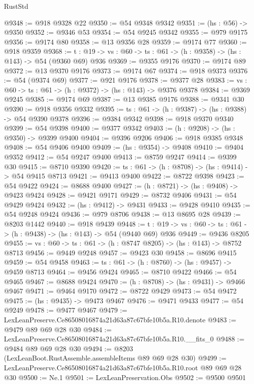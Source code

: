 \begin{lexlean}{RustStd}
\begin{coremodule}
@9348 := @918 @9328 @22
@9350 := @54 @9348 @9342
@9351 := (hs : @56) -> @9350
@9352 := @9346 @53
@9354 := @54 @9245 @9342
@9355 := @979 @9175
@9356 := @9174 @80
@9358 := @13 @9356 @28
@9359 := @9174 @77
@9360 := @918 @9359
@9368 := {t : @19} -> {vs : @60} -> {ts : @61} -> (h : @9358) -> (hs : @143) -> @54 (@9360 @69) @936
@9369 := @9355 @9176
@9370 := @9174 @89
@9372 := @13 @9370 @9176
@9373 := @9174 @67
@9374 := @918 @9373
@9376 := @54 (@9374 @69)
@9377 := @921 @9176
@9378 := @9377 @28
@9383 := {vs : @60} -> {ts : @61} -> (h : @9372) -> (hs : @143) -> @9376 @9378
@9384 := @9369 @9245
@9385 := @9174 @69
@9387 := @13 @9385 @9176
@9388 := @9341 @30
@9390 := @918 @9356 @9332
@9395 := {ts : @61} -> (h : @9387) -> (hs : @9388) -> @54 @9390 @9378
@9396 := @9384 @9342
@9398 := @918 @9370 @9340
@9399 := @54 @9398
@9400 := @9377 @9342
@9403 := (h : @9208) -> (hs : @9350) -> @9399 @9400
@9404 := @9396 @9206
@9406 := @918 @9385 @9348
@9408 := @54 @9406 @9400
@9409 := (hs : @9354) -> @9408
@9410 := @9404 @9352
@9412 := @54 @9247 @9400
@9413 := @8759 @9247
@9414 := @9399 @30
@9415 := @8710 @9390
@9420 := {ts : @61} -> (h : @8708) -> (hs : @9414) -> @54 @9415 @8713
@9421 := @9413 @9400
@9422 := @8722 @9398
@9423 := @54 @9422
@9424 := @8688 @9400
@9427 := (h : @8721) -> (hs : @9408) -> @9423 @9424
@9428 := @9421 @9171
@9429 := @8732 @9406
@9431 := @54 @9429 @9424
@9432 := (hs : @9412) -> @9431
@9433 := @9428 @9410
@9435 := @54 @9248 @9424
@9436 := @979 @8706
@9438 := @13 @8695 @28
@9439 := @8203 @1442
@9440 := @918 @9439
@9448 := {t : @19} -> {vs : @60} -> {ts : @61} -> (h : @9438) -> (hs : @143) -> @54 (@9440 @69) @936
@9449 := @9436 @8205
@9455 := {vs : @60} -> {ts : @61} -> (h : @8747 @8205) -> (hs : @143) -> @8752 @8713
@9456 := @9449 @9248
@9457 := @9423 @30
@9458 := @8696 @9415
@9459 := @54 @9458
@9463 := {ts : @61} -> (h : @8760) -> (hs : @9457) -> @9459 @8713
@9464 := @9456 @9424
@9465 := @8710 @9422
@9466 := @54 @9465
@9467 := @8688 @9424
@9470 := (h : @8708) -> (hs : @9431) -> @9466 @9467
@9471 := @9464 @9170
@9472 := @8722 @9429
@9473 := @54 @9472
@9475 := (hs : @9435) -> @9473 @9467
@9476 := @9471 @9433
@9477 := @54 @9249
@9478 := @9477 @9467
@9479 := LexLeanPreserve.Ce86508016874a21d63a87c67bfe10b5a.R10.denote
@9483 := @9479 @89 @69 @28 @30
@9484 := LexLeanPreserve.Ce86508016874a21d63a87c67bfe10b5a.R10.__fits_0
@9488 := @9484 @89 @69 @28 @30
@9494 := @8203 (LexLeanBoot.RustAssemble.assembleItems @89 @69 @28 @30)
@9499 := LexLeanPreserve.Ce86508016874a21d63a87c67bfe10b5a.R10.root @89 @69 @28 @30
@9500 := Ne.{1}
@9501 := LexLeanPreservation.Obs
@9502 := @9500 @9501

\end{coremodule}
\end{lexlean}
